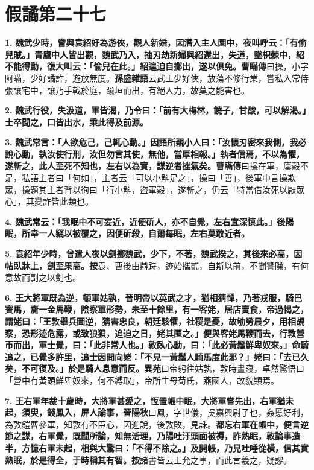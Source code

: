\chapter{假譎第二十七}

\textbf{1.} \textbf{魏武少時，嘗與袁紹好為游俠，觀人新婚，因潛入主人園中，夜叫呼云：「有偷兒賊。」青廬中人皆出觀，魏武乃入，抽刃劫新婦與紹還出，失道，墜枳棘中，紹不能得動，復大叫云：「偷兒在此。」紹遑迫自擲出，遂以俱免。}{\footnotesize \textbf{曹瞞傳}曰操，小字阿瞞，少好譎詐，遊放無度。\textbf{孫盛雜語}云武王少好俠，放蕩不修行業，嘗私入常侍張讓宅中，讓乃手戟於庭，踰垣而出，有絕人力，故莫之能害也。}

\textbf{2.} \textbf{魏武行役，失汲道，軍皆渴，乃令曰：「前有大梅林，饒子，甘酸，可以解渴。」士卒聞之，口皆出水，乘此得及前源。}

\textbf{3.} \textbf{魏武常言：「人欲危己，己輒心動。」因語所親小人曰：「汝懷刃密來我側，我必說心動，執汝使行刑，汝但勿言其使，無他，當厚相報。」執者信焉，不以為懼，遂斬之，此人至死不知也，左右以為實，謀逆者挫氣矣。}{\footnotesize \textbf{曹瞞傳}曰操在軍，廩穀不足，私語主者曰「何如」，主者云「可以小斛足之」，操曰「善」，後軍中言操欺眾，操題其主者背以徇曰「行小斛，盜軍穀」，遂斬之，仍云「特當借汝死以厭眾心」，其變詐皆此類也。}

\textbf{4.} \textbf{魏武常云：「我眠中不可妄近，近便斫人，亦不自覺，左右宜深慎此。」後陽眠，所幸一人竊以被覆之，因便斫殺，自爾每眠，左右莫敢近者。}

\textbf{5.} \textbf{袁紹年少時，曾遣人夜以劍擲魏武，少下，不著，魏武揆之，其後來必高，因帖臥牀上，劍至果高。}{\footnotesize \textbf{按}袁、曹後由鼎跱，迹始攜貳，自斯以前，不聞讐隟，有何意故而剚之以劍也。}

\textbf{6.} \textbf{王大將軍既為逆，頓軍姑孰，晉明帝以英武之才，猶相猜憚，乃著戎服，騎巴賨馬，齎一金馬鞭，陰察軍形勢，未至十餘里，有一客姥，居店賣食，帝過愒之，謂姥曰：「王敦舉兵圖逆，猜害忠良，朝廷駭懼，社稷是憂，故劬勞晨夕，用相覘察，恐形迹危露，或致狼狽，追迫之日，姥其匿之。」便與客姥馬鞭而去，行敦營帀而出，軍士覺，曰：「此非常人也。」敦臥心動，曰：「此必黃鬚鮮卑奴來。」命騎追之，已覺多許里，追士因問向姥：「不見一黃鬚人騎馬度此邪？」姥曰：「去已久矣，不可復及。」於是騎人息意而反。}{\footnotesize \textbf{異苑}曰帝躬往姑孰，敦時晝寢，卓然驚悟曰「營中有黃頭鮮卑奴來，何不縛取」，帝所生母荀氏，燕國人，故貌類焉。}

\textbf{7.} \textbf{王右軍年裁十歲時，大將軍甚愛之，恆置帳中眠，大將軍嘗先出，右軍猶未起，須臾，錢鳳入，屏人論事，}{\footnotesize \textbf{晉陽秋}曰鳳，字世儀，吳嘉興尉子也，姦慝好利，為敦鎧曹參軍，知敦有不臣心，因進說，後敦敗，見誅。}\textbf{都忘右軍在帳中，便言逆節之謀，右軍覺，既聞所論，知無活理，乃陽吐汙頭面被褥，詐熟眠，敦論事造半，方憶右軍未起，相與大驚曰：「不得不除之。」及開帳，乃見吐唾從橫，信其實熟眠，於是得全，于時稱其有智。}{\footnotesize \textbf{按}諸書皆云王允之事，而此言羲之，疑謬。}

